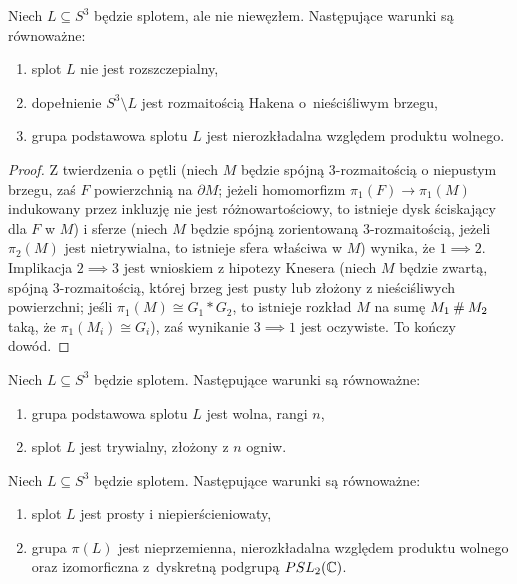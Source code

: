 \begin{proposition}
    Niech $L \subseteq S^3$ będzie splotem, ale nie niewęzłem.
    Następujące warunki są równoważne:
    \begin{enumerate}
        \item splot $L$ nie jest rozszczepialny,
%
        \item dopełnienie $S^3 
        \setminus L$ jest rozmaitością Hakena o~nieściśliwym brzegu,
%
        \item grupa podstawowa splotu $L$ jest nierozkładalna względem produktu wolnego.
    \end{enumerate}
\end{proposition}

\begin{proof}
    Z twierdzenia o pętli (niech $M$ będzie spójną 3-rozmaitością o niepustym brzegu, zaś $F$ powierzchnią na $\partial M$; jeżeli homomorfizm $\pi_1(F) \to \pi_1(M)$ indukowany przez inkluzję nie jest różnowartościowy, to istnieje dysk ściskający dla $F$ w $M$) i sferze (niech $M$ będzie spójną zorientowaną 3-rozmaitością, jeżeli $\pi_2(M)$ jest nietrywialna, to istnieje sfera właściwa w $M$) wynika, że $1 \implies 2$.
%
%
    Implikacja $2 \implies 3$ jest wnioskiem z hipotezy Knesera (niech $M$ będzie zwartą, spójną 3-rozmaitością, której brzeg jest pusty lub złożony z nieściśliwych powierzchni; jeśli $\pi_1(M) \cong G_1 * G_2$, to istnieje rozkład $M$ na sumę $M_1 \mathbin{\#} M_2$ taką, że $\pi_1(M_i) \cong G_i$), zaś wynikanie $3 \implies 1$ jest oczywiste.
%
    To kończy dowód.
\end{proof}

\begin{corollary}
    Niech $L \subseteq S^3$ będzie splotem.
    Następujące warunki są równoważne:
    \begin{enumerate}
        \item grupa podstawowa splotu $L$ jest wolna, rangi $n$,
        \item splot $L$ jest trywialny, złożony z $n$ ogniw.
    \end{enumerate}
\end{corollary}

\begin{proposition}
    Niech $L \subseteq S^3$ będzie splotem.
    Następujące warunki są równoważne:
    \begin{enumerate}
        \item splot $L$ jest prosty i niepierścieniowaty,
        \item grupa $\pi(L)$ jest nieprzemienna, nierozkładalna względem produktu wolnego oraz izomorficzna z~dyskretną podgrupą $PSL_2(\mathbb C)$.
    \end{enumerate}
\end{proposition}

